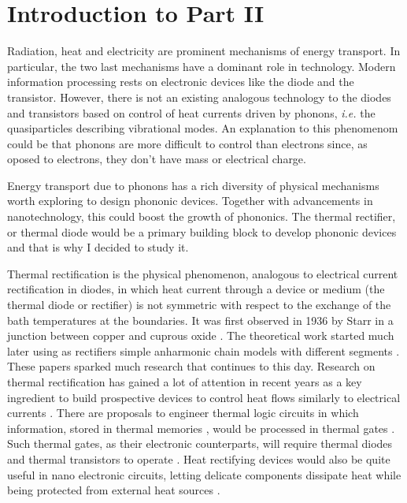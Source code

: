 
\chapter*{Introduction to Part II}
\label{IntroductionPartII}

Radiation, heat and electricity are prominent mechanisms of energy transport. In particular, the two last mechanisms have a dominant role in technology. Modern information processing rests on electronic devices like the diode and the transistor. However, there is not an existing analogous technology to the diodes and transistors based on control of heat currents driven by phonons, \textit{i.e.} the quasiparticles describing vibrational modes. An explanation to this phenomenom could be that phonons are more difficult to control than electrons since, as oposed to electrons, they don't have mass or electrical charge.

Energy transport due to phonons has a rich diversity of physical mechanisms worth exploring to design phononic devices. Together with advancements in nanotechnology, this could boost the growth of phononics. The thermal rectifier, or thermal diode would be a primary building block to develop phononic devices and that is why I decided to study it.

Thermal rectification is the physical phenomenon, analogous to electrical current rectification in diodes, in which heat current through a device or medium (the thermal diode or rectifier) is not symmetric with respect to the exchange of the bath temperatures at the boundaries. It was  first observed in 1936 by Starr in a junction between copper and cuprous oxide \cite{Starr1936}. The theoretical work started much later  using as rectifiers simple anharmonic chain models
with different segments \cite{Terraneo2002,Li2004}. These papers sparked much research that continues to this day. Research on thermal rectification has gained a lot of attention in recent years as a key ingredient to build prospective devices to control heat flows similarly to electrical currents \cite{Roberts2011,Li2012}. There are  proposals to engineer thermal logic circuits \cite{Ye2017} in which information, stored in thermal memories \cite{Wang2008}, would be processed in thermal gates \cite{Wang2007}. Such thermal gates, as their electronic counterparts,  will require thermal diodes and thermal transistors  to operate \cite{Li2006,Joulain2016}.
Heat rectifying devices would also be quite useful in nano electronic circuits, letting delicate components dissipate heat while being protected from external heat sources \cite{Roberts2011}.


